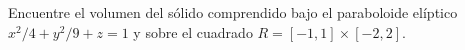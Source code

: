 \item Encuentre el volumen del sólido comprendido bajo el paraboloide elíptico $x^2/4 + y^2/9 + z = 1$ y sobre el cuadrado $R = [-1, 1] \times [-2, 2]$.
